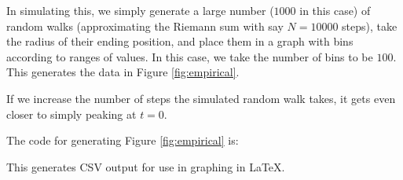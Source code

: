 \documentclass[10pt]{article}
\theoremstyle{customthm}
\begin{document}
In simulating this, we simply generate a large number (\( 1000 \) in this case) of random walks (approximating the Riemann sum with say \( N = 10000 \) steps), take the radius of their ending position, and place them in a graph with bins according to ranges of values. In this case, we take the number of bins to be \( 100 \). This generates the data in Figure \ref{fig:empirical}.

If we increase the number of steps the simulated random walk takes, it gets even closer to simply peaking at \( t = 0 \).

The code for generating Figure \ref{fig:empirical} is:

This generates CSV output for use in graphing in \LaTeX.
\end{document}
